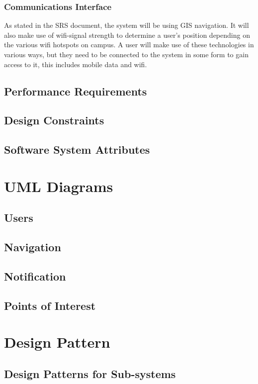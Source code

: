 \documentclass{article}
\begin{document}
		\subsubsection{Communications Interface}
As stated in the SRS document, the system will be using GIS navigation. It will also make use of wifi-signal strength to determine a user's position depending on the various wifi hotspots on campus. A user will make use of these technologies in various ways, but they need to be connected to the system in some form to gain access to it, this includes mobile data and wifi.
	\subsection{Performance Requirements}
	
	\subsection{Design Constraints}
	
	\subsection{Software System Attributes}

\section{UML Diagrams}
	\subsection{Users}
	
	\subsection{Navigation}
	
	\subsection{Notification}
	
	\subsection{Points of Interest}

\section{Design Pattern}
	\subsection{Design Patterns for Sub-systems}
	
\end{document}
